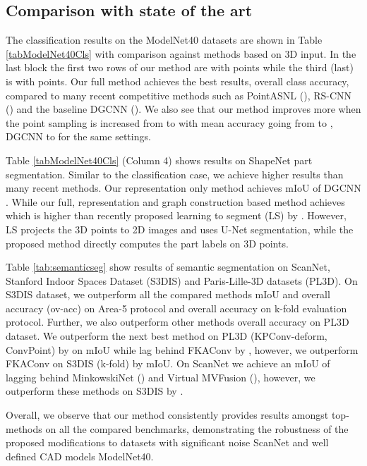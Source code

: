 \vspace{-3ex}
\subsection{Comparison with state of the art}
\vspace{-1.5ex}
 The classification results on the ModelNet40 datasets are shown in Table \ref{tabModelNet40Cls} with comparison against methods based on 3D input. In
the last block the first two rows of our method are with  points while the third (last) is with  points.  Our full method achieves the best results, \eg  overall class accuracy, compared to many recent
competitive methods such as PointASNL (), RS-CNN () and the baseline DGCNN (). We also see that our method improves more when the point sampling is increased from  to
 with mean accuracy going from  to , \cf  DGCNN  to  for the same settings. 

 Table \ref{tabModelNet40Cls} (Column 4) shows results on ShapeNet part segmentation. Similar to the classification case, we achieve higher results than many recent methods. Our representation only method achieves  mIoU \cf  of DGCNN \cite{wang2019dynamic}. While
our full, representation and graph construction based method achieves  which is higher than recently proposed learning to segment (LS) by . However, LS projects the 3D points to 2D images and uses U-Net segmentation, while the proposed method directly computes the part labels on 3D points.

 Table \ref{tab:semanticseg} show results of semantic segmentation on ScanNet, Stanford Indoor Spaces Dataset (S3DIS) and  Paris-Lille-3D datasets (PL3D). On S3DIS dataset, we outperform all the compared methods \wrt mIoU and overall accuracy (ov-acc) on Area-5 protocol and \wrt overall accuracy on k-fold evaluation protocol. Further, we also outperform other methods \wrt overall accuracy on PL3D dataset. We outperform the next best method on PL3D (KPConv-deform, ConvPoint) by  on mIoU while lag behind FKAConv by , however, we outperform FKAConv on S3DIS (k-fold) by  \wrt mIoU. On ScanNet we achieve an mIoU of  lagging behind MinkowskiNet () and Virtual MVFusion (), however, we outperform these methods on S3DIS by .  

Overall, we observe that our method consistently provides results amongst top- methods on all the compared benchmarks, demonstrating the robustness of the proposed modifications to datasets with significant noise \eg ScanNet and well defined CAD models \eg ModelNet40.

